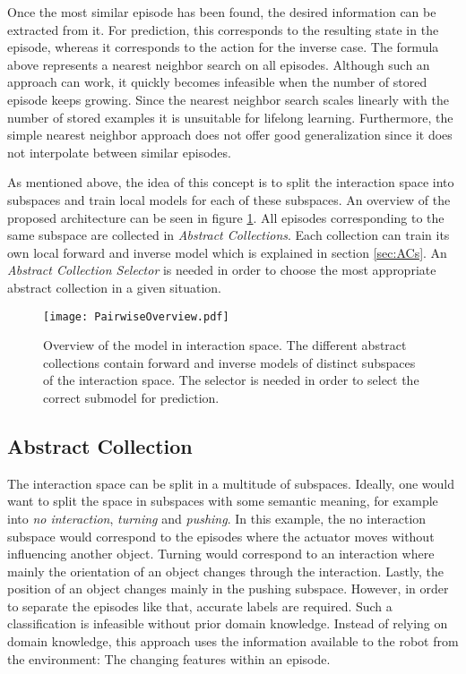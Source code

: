 Once the most similar episode has been found, the desired information can be extracted from it. For prediction, this corresponds to the resulting state in the episode, whereas it corresponds to the action for the inverse case. The formula above represents a nearest neighbor search on all episodes. Although such an approach can work, it quickly becomes infeasible when the number of stored episode keeps growing. Since the nearest neighbor search scales linearly with the number of stored examples it is unsuitable for lifelong learning. %
Furthermore, the simple nearest neighbor approach does not offer good generalization since it does not interpolate between similar episodes. 

As mentioned above, the idea of this concept is to split the interaction space into subspaces and train local models for each of these subspaces. An overview of the proposed architecture can be seen in figure \ref{fig:PairOverview}.
All episodes corresponding to the same subspace are collected in \textit{Abstract Collections}. Each collection can train its own local forward and inverse model which is explained in section \ref{sec:ACs}.
An \textit{Abstract Collection Selector} is needed in order to choose the most appropriate abstract collection in a given situation. 


\begin{figure}
	\centering
	\texttt{[image: PairwiseOverview.pdf]}
	\caption{Overview of the model in interaction space. The different abstract collections contain forward and inverse models of distinct subspaces of the interaction space. The selector is needed in order to select the correct submodel for prediction.}%
	\label{fig:PairOverview}
\end{figure}

\subsection{Abstract Collection \label{sec:ACs}}

The interaction space can be split in a multitude of subspaces. Ideally, one would want to split the space in subspaces with some semantic meaning, for example into \textit{no interaction}, \textit{turning} and \textit{pushing}. In this example, the no interaction subspace would correspond to the episodes where the actuator moves without influencing another object. Turning would correspond to an interaction where mainly the orientation of an object changes through the interaction. Lastly, the position of an object changes mainly in the pushing subspace. However, in order to separate the episodes like that, accurate labels are required. Such a classification is infeasible without prior domain knowledge. 
Instead of relying on domain knowledge, this approach uses the information available to the robot from the environment: The changing features within an episode.


